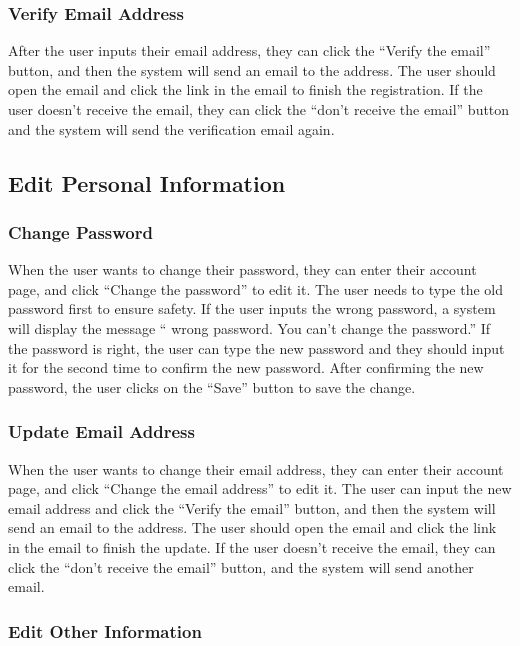 \documentclass[conference]{IEEEtran}
\begin{document}
\subsubsection{ Verify Email Address }

After the user inputs their email address, they can click the “Verify the 
email” button, and then the system will send an email to the address. The user
should open the email and click the link in the email to finish the registration. If 
the user doesn't receive the email, they can click the “don’t receive the email” 
button and the system will send the verification email again.

\subsection{ Edit Personal Information }

\subsubsection{ Change Password }

When the user wants to change their password, they can enter their 
account page, and click “Change the password” to edit it. The user needs to 
type the old password first to ensure safety. If the user inputs the wrong 
password, a system will display the message “ wrong password. You can’t 
change the password.” If the password is right, the user can type the new 
password and they should input it for the second time to confirm the new
password. After confirming the new password, the user clicks on the “Save”
button to save the change.

\subsubsection{ Update Email Address }

When the user wants to change their email address, they can enter their 
account page, and click “Change the email address” to edit it. The user can 
input the new email address and click the “Verify the email” button, and then the 
system will send an email to the address. The user should open the email and 
click the link in the email to finish the update. If the user doesn't receive the 
email, they can click the “don’t receive the email” button, and the system will 
send another email.

\subsubsection{ Edit Other Information }
\end{document}
